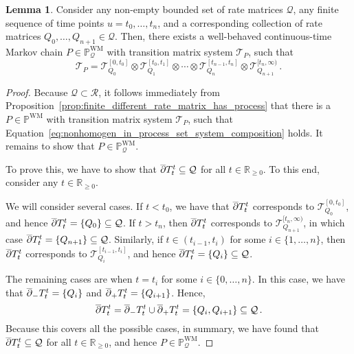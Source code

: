 \documentclass[10pt,a4paper]{paper}
\theoremstyle{definition}
\newtheorem{lemma}[theorem]{Lemma}
\newcommand{\reals}{\mathbb{R}}
\newcommand{\realsnonneg}{\reals_{\geq 0}}
\newcommand{\processes}{\mathbb{P}}
\newcommand{\wmprocesses}{\processes^{\mathrm{WM}}}
\newcommand{\rateset}{\mathcal{Q}}
\begin{document}
\begin{lemma}\label{lemma:nonhomogeneous_in_process_set}
Consider any non-empty bounded set of rate matrices $\rateset$, any finite sequence of time points $u=t_0,\ldots,t_n$, and a corresponding collection of rate matrices $Q_0,\ldots,Q_{n+1}\in\rateset$. Then, there exists a well-behaved continuous-time Markov chain $P\in\wmprocesses_\rateset$ with transition matrix system $\mathcal{T}_P$, such that
\begin{equation}\label{eq:nonhomogen_in_process_set_system_composition}
\mathcal{T}_P = \mathcal{T}_{Q_0}^{[0,t_0]}\otimes \mathcal{T}_{Q_1}^{[t_0,t_1]} \otimes \cdots \otimes \mathcal{T}_{Q_n}^{[t_{n-1},t_n]} \otimes \mathcal{T}_{Q_{n+1}}^{[t_n,\infty)}\,.
\end{equation}
\end{lemma}
\begin{proof}
Because $\rateset\subset\mathcal{R}$, it follows immediately from Proposition~\ref{prop:finite_different_rate_matrix_has_process} that there is a $P\in\wmprocesses$ with transition matrix system $\mathcal{T}_P$, such that Equation~\eqref{eq:nonhomogen_in_process_set_system_composition} holds. It remains to show that $P\in\wmprocesses_\rateset$.

To prove this, we have to show that $\smash{\overline{\partial}}T_t^t\subseteq\rateset$ for all $t\in\realsnonneg$. To this end, consider any $t\in\realsnonneg$.

We will consider several cases. If $t<t_0$, we have that $\smash{\overline{\partial}}T_t^t$ corresponds to $\mathcal{T}_{Q_0}^{[0,t_0]}$, and hence $\smash{\overline{\partial}}T_t^t=\{Q_0\}\subseteq\rateset$. If $t>t_n$, then $\smash{\overline{\partial}}T_t^t$ corresponds to $\mathcal{T}_{Q_{n+1}}^{[t_n,\infty)}$, in which case $\smash{\overline{\partial}}T_t^t=\{Q_{n+1}\}\subseteq\rateset$. Similarly, if $t\in(t_{i-1},t_i)$ for some $i\in\{1,\ldots,n\}$, then $\smash{\overline{\partial}}T_t^t$ corresponds to $\mathcal{T}_{Q_i}^{[t_{i-1},t_i]}$, and hence $\smash{\overline{\partial}}T_t^t=\{Q_i\}\subseteq\rateset$.

The remaining cases are when $t=t_i$ for some $i\in\{0,\ldots,n\}$. In this case, we have that $\smash{\overline{\partial}}_-T_t^t=\{Q_i\}$ and $\smash{\overline{\partial}}_+T_t^t=\{Q_{i+1}\}$. Hence,
\begin{equation*}
\smash{\overline{\partial}}T_t^t = \smash{\overline{\partial}}_-T_t^t\cup\smash{\overline{\partial}}_+T_t^t=\{Q_{i},Q_{i+1}\}\subseteq\rateset\,.
\end{equation*}
Because this covers all the possible cases, in summary, we have found that $\smash{\overline{\partial}}T_t^t\subseteq\rateset$ for all $t\in\realsnonneg$, and hence $P\in\wmprocesses_\rateset$.
\end{proof}
\end{document}
